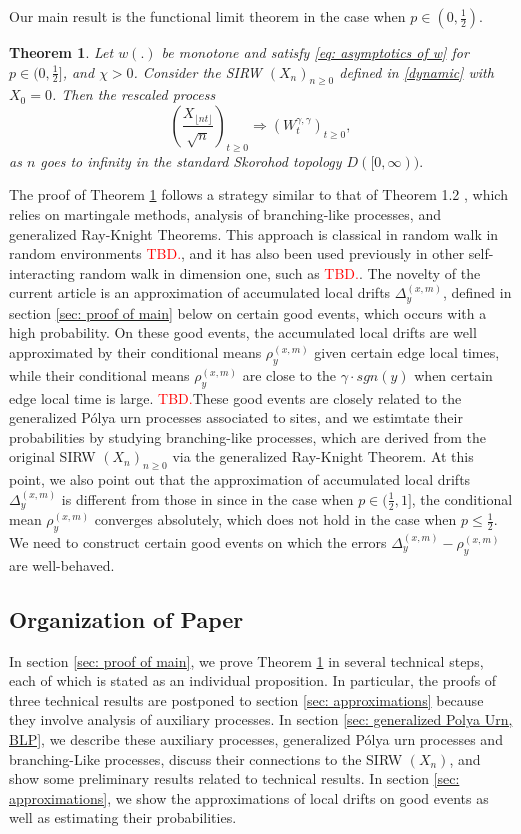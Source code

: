 \documentclass[twoside,12pt,a4paper]{article}
\newtheorem{theorem}{Theorem}[section]
\numberwithin{equation}{section}
\newcommand\TBD{\textcolor{red}{TBD.}}
\begin{document}
	Our main result is the functional limit theorem in the case when $p\in (0,\frac{1}{2})$.
	\begin{theorem}\label{thm: main}
		Let $w(.)$ be monotone and satisfy \eqref{eq: asymptotics of w} for $p\in (0,\frac{1}{2}]$, and $\mathcal{\chi} >0 $. Consider the SIRW $(X_n)_{n\geq 0}$ defined in \eqref{dynamic} with $X_0 =0$. Then the rescaled process
		$$
		\left(  \frac{X_{\lfloor nt \rfloor }}{\sqrt{n}}  \right)_{t\geq 0} \Longrightarrow \left( W^{\gamma,\gamma}_{t}\right)_{t\geq 0},
		$$ as $n$ goes to infinity in the standard Skorohod topology $D([0,\infty) ).$
	\end{theorem}
	The proof of Theorem \ref{thm: main} follows a strategy similar to that of Theorem 1.2 \cite{KMP22}, which relies on martingale methods, analysis of branching-like processes, and generalized Ray-Knight Theorems. This approach is classical in random walk in random environments \TBD, and it has also been used previously in other self-interacting random walk in dimension one, such as \TBD. The novelty of the current article is an approximation of accumulated local drifts $\Delta_y^{(x,m)}$, defined in section \ref{sec: proof of main} below on certain good events, which occurs with a high probability. On these good events, the accumulated local drifts are well approximated by their conditional means $\rho_{y}^{(x,m)}$ given certain edge local times, while their conditional means $\rho_{y}^{(x,m)}$ are close to the $\gamma \cdot sgn(y)$ when certain edge local time is large. \TBD These good events are closely related to the generalized P\'{o}lya  urn processes associated to sites, and we estimtate their probabilities by studying branching-like processes, which are derived from the original SIRW $(X_n)_{n\geq 0}$ via the generalized Ray-Knight Theorem. At this point, we also point out that the approximation of accumulated local drifts $\Delta_y^{(x,m)}$ is different from those in \cite{KMP22} since in the case when $p\in(\frac{1}{2},1]$, the conditional mean $\rho_{y}^{(x,m)}$ converges absolutely, which does not hold in the case when $p\leq \frac{1}{2}$. We need to construct certain good events on which the errors $\Delta_y^{(x,m)}- \rho_y^{(x,m)}$ are well-behaved.
	
	\subsection{Organization of Paper}
	In section \ref{sec: proof of main}, we prove Theorem \ref{thm: main} in several technical steps, each of which is stated as an individual proposition. In particular, the proofs of three technical results are postponed to section \ref{sec: approximations} because they involve analysis of auxiliary processes. In section \ref{sec: generalized Polya Urn, BLP}, we describe these auxiliary processes, generalized P\'{o}lya urn processes and branching-Like processes, discuss their connections to the SIRW $(X_n)$, and show some preliminary results related to technical results. In section \ref{sec: approximations}, we show the approximations of local drifts on good events as well as estimating their probabilities. 
	
\end{document}
